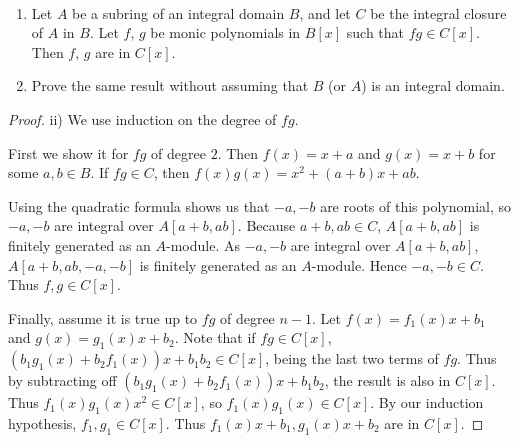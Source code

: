 \begin{exercise}
	~
	\begin{enumerate}
		\item Let $A$ be a subring of an integral domain $B$, and let $C$ be the integral closure of $A$ in $B$. Let $f,\,g$ be monic polynomials in $B[x]$ such that $fg \in C[x]$. Then $f,\, g$ are in $C[x]$.
		\item Prove the same result without assuming that $B$ (or $A$) is an integral domain.
	\end{enumerate}
\end{exercise}
\begin{proof}
	ii)
	We use induction on the degree of $fg $.

	First we show it for $fg $ of degree $2$.
	Then $f(x) = x+a $ and $g(x) = x+b $ for some $a,b \in B $.
	If $fg \in C $, then $f(x)g(x) = x^2+(a+b)x+ab $.

	Using the quadratic formula shows us that $-a,-b $ are roots of this polynomial, so $-a,-b $ are integral over $A[a+b,ab]$.
	Because $a+b,ab \in C $, $A[a+b,ab] $ is finitely generated as an $A $-module.
	As $-a,-b $ are integral over $A[a+b,ab] $, $A[a+b,ab,-a,-b] $ is finitely generated as an $A$-module.
	Hence $-a,-b \in C $.
	Thus $f,g \in C[x] $.

	Finally, assume it is true up to $fg $ of degree $n-1 $.
	Let $f(x) = f_{1}(x)x + b_{1} $ and $g(x) = g_{1}(x)x + b_{2} $.
	Note that if $fg \in C[x] $, $(b_{1}g_{1}(x)+b_{2}f_{1}(x))x + b_{1}b_{2} \in C[x] $, being the last two terms of $fg $.
	Thus by subtracting off $(b_{1}g_{1}(x)+b_{2}f_{1}(x))x + b_{1}b_{2} $, the result is also in $C[x] $.
	Thus $f_{1}(x)g_{1}(x)x^2 \in C[x] $, so $f_{1}(x)g_{1}(x) \in C[x] $.
	By our induction hypothesis, $f_{1},g_{1} \in C[x] $.
	Thus $f_{1}(x)x+b_{1}, g_{1}(x)x+b_{2} $ are in $C[x] $.
\end{proof}

